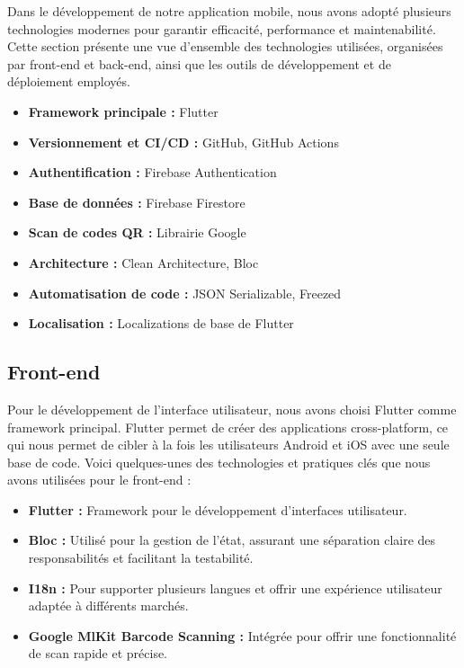 Dans le développement de notre application mobile, nous avons adopté plusieurs technologies modernes pour garantir efficacité, performance et maintenabilité. Cette section présente une vue d'ensemble des technologies utilisées, organisées par front-end et back-end, ainsi que les outils de développement et de déploiement employés.

\begin{itemize}[noitemsep]
    \item \textbf{Framework principale :} Flutter
    \item \textbf{Versionnement et CI/CD :} GitHub, GitHub Actions
    \item \textbf{Authentification :} Firebase Authentication
    \item \textbf{Base de données :} Firebase Firestore
    \item \textbf{Scan de codes QR :} Librairie Google
    \item \textbf{Architecture :} Clean Architecture, Bloc
    \item \textbf{Automatisation de code :} JSON Serializable, Freezed
    \item \textbf{Localisation :} Localizations de base de Flutter
\end{itemize}

\subsection{Front-end}

Pour le développement de l'interface utilisateur, nous avons choisi Flutter comme framework principal. Flutter permet de créer des applications cross-platform, ce qui nous permet de cibler à la fois les utilisateurs Android et iOS avec une seule base de code. Voici quelques-unes des technologies et pratiques clés que nous avons utilisées pour le front-end :

\begin{itemize}[noitemsep]
    \item \textbf{Flutter :} Framework pour le développement d'interfaces utilisateur.
    \item \textbf{Bloc :} Utilisé pour la gestion de l'état, assurant une séparation claire des responsabilités et facilitant la testabilité.
    \item \textbf{I18n :} Pour supporter plusieurs langues et offrir une expérience utilisateur adaptée à différents marchés.
    \item \textbf{Google MlKit Barcode Scanning :} Intégrée pour offrir une fonctionnalité de scan rapide et précise.
\end{itemize}

